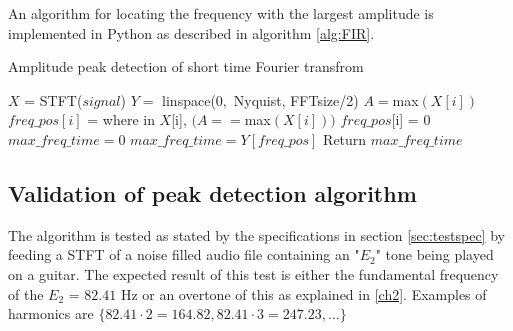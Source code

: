 An algorithm for locating the frequency with the largest amplitude is implemented in Python as described in algorithm \ref{alg:FIR}.
\begin{algorithm}[H]
\caption{Amplitude peak detection of short time Fourier transfrom}
\label{alg:FIR}
\begin{algorithmic}[1] 
\State  $X$ = STFT($signal$) 
\State $Y =$ linspace($0,$ Nyquist, FFTsize/2) 
		\State $A = $max$(X[i])$ 
		 
			\State $freq\_pos[i]$ = where in $X$[i], $(A == $max$(X[i]))$ 
		\Else
			\State $freq\_pos$[i] = 0	
		\EndIf
			\State $max\_freq\_time = 0$
		\Else
			\State $max\_freq\_time = Y[freq\_pos]$
		\EndIf
	\EndFor
	\State Return $max\_freq\_time$
\EndProcedure
\end{algorithmic}
\end{algorithm}

\subsection{Validation of peak detection algorithm}
The algorithm is tested as stated by the specifications in section \ref{sec:testspec} by feeding a STFT of a noise filled audio file containing an "$E_2$" tone being played on a guitar. 
The expected result of this test is either the fundamental frequency of the $E_2$ = $82.41$ Hz or an overtone of this as explained in \ref{ch2}. Examples of harmonics are  $\{82.41 \cdot 2 = 164.82, 82.41 \cdot 3 = 247.23, \dots \}$ 

